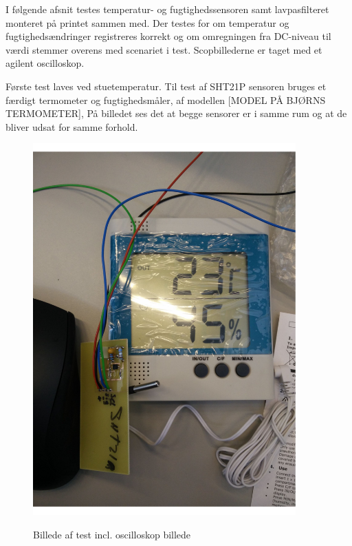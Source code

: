 

I følgende afsnit testes temperatur- og fugtighedssensoren samt lavpasfilteret monteret på printet sammen med. Der testes for om temperatur og fugtighedsændringer registreres korrekt og om omregningen fra DC-niveau til værdi stemmer overens med scenariet i test. Scopbillederne er taget med et agilent oscilloskop.

Første test laves ved stuetemperatur. Til test af SHT21P sensoren bruges et færdigt termometer og fugtighedsmåler, af modellen [MODEL PÅ BJØRNS TERMOMETER], På billedet ses det at begge sensorer er i samme rum og at de bliver udsat for samme forhold. 

\begin{figure}[h]
\centering
{\includegraphics[width=0.90\textwidth]{filer/modultest/Billeder/test_stue}}
\caption{Billede af test incl. oscilloskop billede}
\label{lab:test_stue}
\end{figure}

